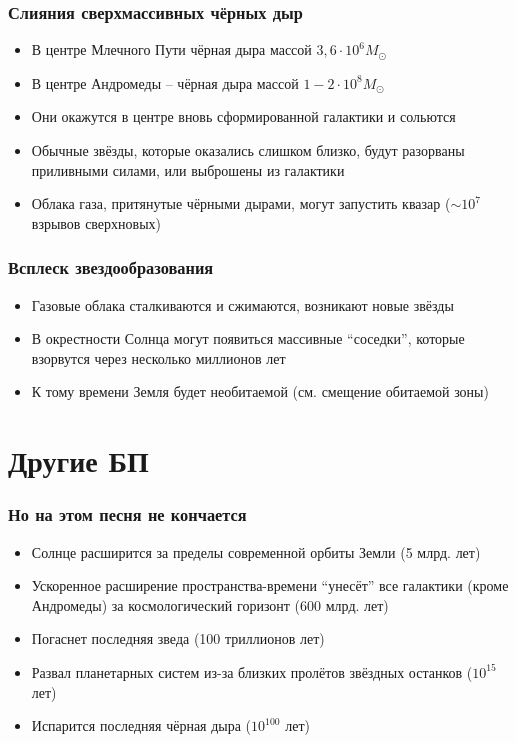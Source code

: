 \documentclass[aspectratio=169]{beamer}
\begin{document}
\begin{frame}
\frametitle{Слияния сверхмассивных чёрных дыр}
\begin{itemize}
\item В центре Млечного Пути чёрная дыра массой $3,6 \cdot 10^6 M_\odot$
\item В центре Андромеды -- чёрная дыра массой $1 - 2 \cdot 10^8 M_\odot$
\item Они окажутся в центре вновь сформированной галактики и сольются
\item Обычные звёзды, которые оказались слишком близко, будут разорваны приливными силами, или выброшены из галактики
\item Облака газа, притянутые чёрными дырами, могут запустить квазар ($\sim 10^7$ взрывов сверхновых)
\end{itemize}
\end{frame}

\begin{frame}
\frametitle{Всплеск звездообразования}
\begin{itemize}
\item Газовые облака сталкиваются и сжимаются, возникают новые звёзды
\item В окрестности Солнца могут появиться массивные ``соседки'', которые взорвутся через несколько миллионов лет
\item К тому времени Земля будет необитаемой (см. смещение обитаемой зоны)
\end{itemize}
\end{frame}

\section{Другие БП}
\begin{frame}
\frametitle{Но на этом песня не кончается}
\begin{itemize}
\item Солнце расширится за пределы современной орбиты Земли (5 млрд. лет)
\item Ускоренное расширение пространства-времени ``унесёт'' все галактики (кроме Андромеды) за космологический горизонт (600 млрд. лет)
\item Погаснет последняя зведа (100 триллионов лет)
\item Развал планетарных систем из-за близких пролётов звёздных останков ($10^{15}$ лет)
\item Испарится последняя чёрная дыра ($10^{100}$ лет)
\end{itemize}
\end{frame}
\end{document}
